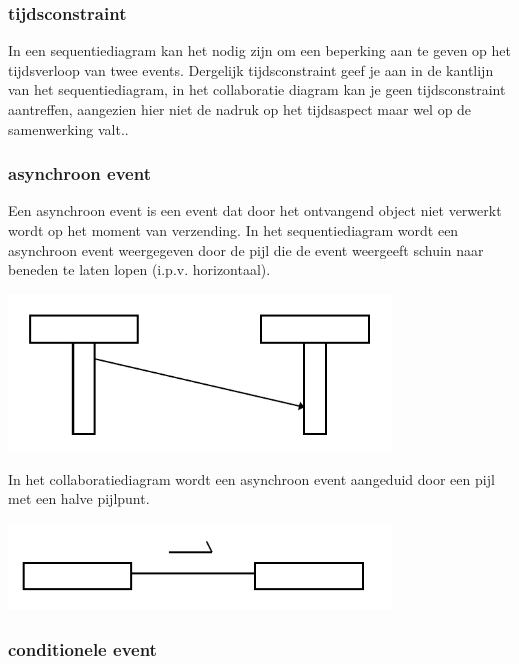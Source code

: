 \subsubsection{tijdsconstraint}

In een sequentiediagram kan het nodig zijn om een beperking aan te geven op het tijdsverloop van twee events.
Dergelijk tijdsconstraint geef je aan in de kantlijn van het sequentiediagram, in het collaboratie diagram kan je geen tijdsconstraint aantreffen, aangezien hier niet de nadruk op het tijdsaspect maar wel op de samenwerking valt..

\subsubsection{asynchroon event}

Een asynchroon event is een event dat door het ontvangend object niet verwerkt wordt op het moment van verzending.
In het sequentiediagram wordt een asynchroon event weergegeven door de pijl die de event weergeeft schuin naar beneden te laten lopen (i.p.v. horizontaal).


\begin{center}
\includegraphics[width=4in]{img/async1}%
\end{center}

In het collaboratiediagram wordt een asynchroon event aangeduid door een pijl met een halve pijlpunt.


\begin{center}
\includegraphics[width=4in]{img/async2}%
\end{center}

\subsubsection{conditionele event}

